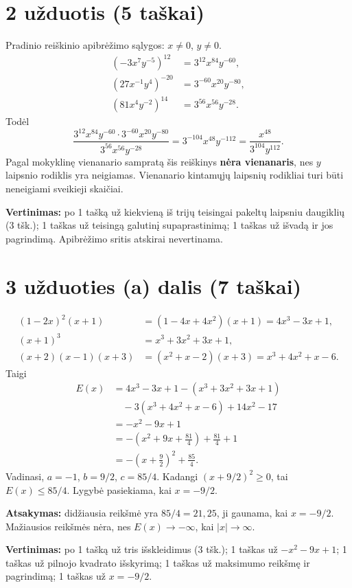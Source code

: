 \documentclass[12pt,a4paper]{exam}
\begin{document}
\section*{2 užduotis (5 taškai)}
Pradinio reiškinio apibrėžimo sąlygos: $x\ne0$, $y\ne0$.
\begin{align*}
(-3x^7y^{-5})^{12}&=3^{12}x^{84}y^{-60},\\
(27x^{-1}y^4)^{-20}&=3^{-60}x^{20}y^{-80},\\
(81x^4y^{-2})^{14}&=3^{56}x^{56}y^{-28}.
\end{align*}
Todėl
$$\frac{3^{12}x^{84}y^{-60}\cdot3^{-60}x^{20}y^{-80}}{3^{56}x^{56}y^{-28}}
=3^{-104}x^{48}y^{-112}=\boxed{\frac{x^{48}}{3^{104}y^{112}}}.$$
Pagal mokyklinę vienanario sampratą šis reiškinys \textbf{nėra vienanaris}, nes $y$ laipsnio rodiklis yra neigiamas. Vienanario kintamųjų laipsnių rodikliai turi būti neneigiami sveikieji skaičiai.
\par\textbf{Vertinimas:} po 1 tašką už kiekvieną iš trijų teisingai pakeltų laipsniu daugiklių (3 tšk.); 1 taškas už teisingą galutinį supaprastinimą; 1 taškas už išvadą ir jos pagrindimą. Apibrėžimo sritis atskirai nevertinama.
\section*{3 užduoties (a) dalis (7 taškai)}
\begin{align*}
(1-2x)^2(x+1)&=(1-4x+4x^2)(x+1)=4x^3-3x+1,\\
(x+1)^3&=x^3+3x^2+3x+1,\\
(x+2)(x-1)(x+3)&=(x^2+x-2)(x+3)=x^3+4x^2+x-6.
\end{align*}
Taigi
\begin{align*}
E(x)&=4x^3-3x+1-(x^3+3x^2+3x+1)\\
&\quad-3(x^3+4x^2+x-6)+14x^2-17\\
&=-x^2-9x+1\\
&=-\left(x^2+9x+\frac{81}{4}\right)+\frac{81}{4}+1\\
&=\boxed{-\left(x+\frac92\right)^2+\frac{85}{4}}.
\end{align*}
Vadinasi, $a=-1$, $b=9/2$, $c=85/4$.
Kadangi $(x+9/2)^2\geq0$, tai $E(x)\leq85/4$.
Lygybė pasiekiama, kai $x=-9/2$.
\par\textbf{Atsakymas:} didžiausia reikšmė yra $85/4=21{,}25$, ji gaunama, kai $x=-9/2$. Mažiausios reikšmės nėra, nes $E(x)\to-\infty$, kai $|x|\to\infty$.
\par\textbf{Vertinimas:} po 1 tašką už tris išskleidimus (3 tšk.); 1 taškas už $-x^2-9x+1$; 1 taškas už pilnojo kvadrato išskyrimą; 1 taškas už maksimumo reikšmę ir pagrindimą; 1 taškas už $x=-9/2$.
\end{document}
